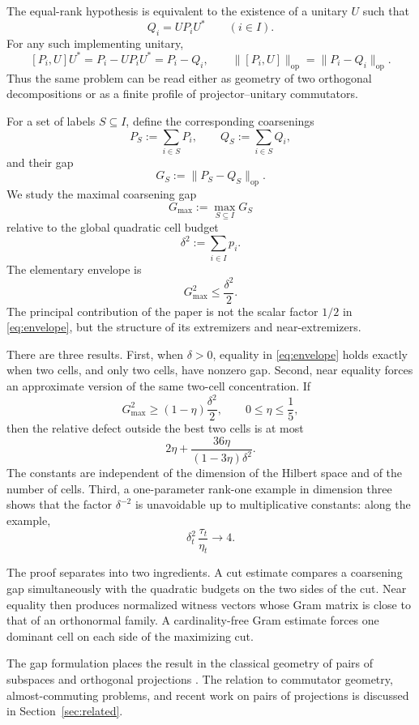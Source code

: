 \documentclass[11pt]{article}
\newcommand{\op}{\mathrm{op}}
\newcommand{\gmax}{G_{\max}}
\newcommand{\dd}{\delta}
\begin{document}
The equal-rank hypothesis is equivalent to the existence of a unitary
$U$ such that
\[
  Q_i=UP_iU^*
  \qquad(i\in I).
\]
For any such implementing unitary,
\begin{equation}\label{eq:gap-comm}
  [P_i,U]U^*=P_i-UP_iU^*=P_i-Q_i,
  \qquad
  \|[P_i,U]\|_{\op}=\|P_i-Q_i\|_{\op}.
\end{equation}
Thus the same problem can be read either as geometry of two orthogonal
decompositions or as a finite profile of projector--unitary commutators.

For a set of labels $S\subseteq I$, define the corresponding coarsenings
\[
  P_S:=\sum_{i\in S}P_i,
  \qquad
  Q_S:=\sum_{i\in S}Q_i,
\]
and their gap
\[
  G_S:=\|P_S-Q_S\|_{\op}.
\]
We study the maximal coarsening gap
\[
  \gmax:=\max_{S\subseteq I}G_S
\]
relative to the global quadratic cell budget
\[
  \dd^2:=\sum_{i\in I}p_i.
\]
The elementary envelope is
\begin{equation}\label{eq:envelope}
  \gmax^2\le\frac{\dd^2}{2}.
\end{equation}
The principal contribution of the paper is not the scalar factor $1/2$ in
\eqref{eq:envelope}, but the structure of its extremizers and
near-extremizers.

There are three results.  First, when $\dd>0$, equality in
\eqref{eq:envelope} holds exactly when two cells, and only two cells, have
nonzero gap.  Second, near equality forces an approximate version of the same
two-cell concentration.  If
\[
  \gmax^2\ge(1-\eta)\frac{\dd^2}{2},
  \qquad 0\le\eta\le\frac15,
\]
then the relative defect outside the best two cells is at most
\[
  2\eta+\frac{36\eta}{(1-3\eta)\dd^2}.
\]
The constants are independent of the dimension of the Hilbert space and of
the number of cells.  Third, a one-parameter rank-one example in dimension
three shows that the factor $\dd^{-2}$ is unavoidable up to multiplicative
constants: along the example,
\[
  \dd_t^2\,\frac{\tau_t}{\eta_t}\longrightarrow4.
\]

The proof separates into two ingredients.  A cut estimate compares a
coarsening gap simultaneously with the quadratic budgets on the two sides of
the cut.  Near equality then produces normalized witness vectors whose Gram
matrix is close to that of an orthonormal family.  A cardinality-free Gram
estimate forces one dominant cell on each side of the maximizing cut.

The gap formulation places the result in the classical geometry of pairs of
subspaces and orthogonal projections
\cite{Halmos1969TwoSubspaces,BottcherSpitkovsky2010,Galantai2008}.
The relation to commutator geometry, almost-commuting problems, and recent
work on pairs of projections is discussed in Section~\ref{sec:related}.
\end{document}
